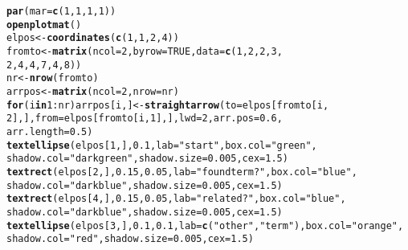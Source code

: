 \documentclass{article}\usepackage[]{graphicx}\usepackage[]{xcolor}
\makeatletter
\newcommand{\hlnum}[1]{\textcolor[rgb]{0.686,0.059,0.569}{#1}}%
\newcommand{\hlsng}[1]{\textcolor[rgb]{0.192,0.494,0.8}{#1}}%
\newcommand{\hlopt}[1]{\textcolor[rgb]{0,0,0}{#1}}%
\newcommand{\hldef}[1]{\textcolor[rgb]{0.345,0.345,0.345}{#1}}%
\newcommand{\hlkwa}[1]{\textcolor[rgb]{0.161,0.373,0.58}{\textbf{#1}}}%
\newcommand{\hlkwb}[1]{\textcolor[rgb]{0.69,0.353,0.396}{#1}}%
\newcommand{\hlkwc}[1]{\textcolor[rgb]{0.333,0.667,0.333}{#1}}%
\newcommand{\hlkwd}[1]{\textcolor[rgb]{0.737,0.353,0.396}{\textbf{#1}}}%
\newenvironment{kframe}{%
 \def\at@end@of@kframe{}%
 \ifinner\ifhmode%
  \def\at@end@of@kframe{\end{minipage}}%
  \begin{minipage}{\columnwidth}%
 \fi\fi%
 \def\FrameCommand##1{\hskip\@totalleftmargin \hskip-\fboxsep
 \colorbox{shadecolor}{##1}\hskip-\fboxsep
     \hskip-\linewidth \hskip-\@totalleftmargin \hskip\columnwidth}%
 \MakeFramed {\advance\hsize-\width
   \@totalleftmargin\z@ \linewidth\hsize
   \@setminipage}}%
 {\par\unskip\endMakeFramed%
 \at@end@of@kframe}
\newenvironment{knitrout}{}{} %
\makeatother
\begin{document}
\begin{knitrout}
\begin{kframe}
\begin{alltt}
\hlkwd{par}\hldef{(}\hlkwc{mar} \hldef{=} \hlkwd{c}\hldef{(}\hlnum{1}\hldef{,} \hlnum{1}\hldef{,} \hlnum{1}\hldef{,} \hlnum{1}\hldef{))}
\hlkwd{openplotmat}\hldef{()}
\hldef{elpos} \hlkwb{<-} \hlkwd{coordinates}\hldef{(}\hlkwd{c}\hldef{(}\hlnum{1}\hldef{,} \hlnum{1}\hldef{,} \hlnum{2}\hldef{,} \hlnum{4}\hldef{))}
\hldef{fromto} \hlkwb{<-} \hlkwd{matrix}\hldef{(}\hlkwc{ncol} \hldef{=} \hlnum{2}\hldef{,} \hlkwc{byrow} \hldef{=} \hlnum{TRUE}\hldef{,} \hlkwc{data} \hldef{=} \hlkwd{c}\hldef{(}\hlnum{1}\hldef{,} \hlnum{2}\hldef{,} \hlnum{2}\hldef{,} \hlnum{3}\hldef{,}
    \hlnum{2}\hldef{,} \hlnum{4}\hldef{,} \hlnum{4}\hldef{,} \hlnum{7}\hldef{,} \hlnum{4}\hldef{,} \hlnum{8}\hldef{))}
\hldef{nr} \hlkwb{<-} \hlkwd{nrow}\hldef{(fromto)}
\hldef{arrpos} \hlkwb{<-} \hlkwd{matrix}\hldef{(}\hlkwc{ncol} \hldef{=} \hlnum{2}\hldef{,} \hlkwc{nrow} \hldef{= nr)}
\hlkwa{for} \hldef{(i} \hlkwa{in} \hlnum{1}\hlopt{:}\hldef{nr) arrpos[i, ]} \hlkwb{<-} \hlkwd{straightarrow}\hldef{(}\hlkwc{to} \hldef{= elpos[fromto[i,}
    \hlnum{2}\hldef{], ],} \hlkwc{from} \hldef{= elpos[fromto[i,} \hlnum{1}\hldef{], ],} \hlkwc{lwd} \hldef{=} \hlnum{2}\hldef{,} \hlkwc{arr.pos} \hldef{=} \hlnum{0.6}\hldef{,}
    \hlkwc{arr.length} \hldef{=} \hlnum{0.5}\hldef{)}
\hlkwd{textellipse}\hldef{(elpos[}\hlnum{1}\hldef{, ],} \hlnum{0.1}\hldef{,} \hlkwc{lab} \hldef{=} \hlsng{"start"}\hldef{,} \hlkwc{box.col} \hldef{=} \hlsng{"green"}\hldef{,}
    \hlkwc{shadow.col} \hldef{=} \hlsng{"darkgreen"}\hldef{,} \hlkwc{shadow.size} \hldef{=} \hlnum{0.005}\hldef{,} \hlkwc{cex} \hldef{=} \hlnum{1.5}\hldef{)}
\hlkwd{textrect}\hldef{(elpos[}\hlnum{2}\hldef{, ],} \hlnum{0.15}\hldef{,} \hlnum{0.05}\hldef{,} \hlkwc{lab} \hldef{=} \hlsng{"found term?"}\hldef{,} \hlkwc{box.col} \hldef{=} \hlsng{"blue"}\hldef{,}
    \hlkwc{shadow.col} \hldef{=} \hlsng{"darkblue"}\hldef{,} \hlkwc{shadow.size} \hldef{=} \hlnum{0.005}\hldef{,} \hlkwc{cex} \hldef{=} \hlnum{1.5}\hldef{)}
\hlkwd{textrect}\hldef{(elpos[}\hlnum{4}\hldef{, ],} \hlnum{0.15}\hldef{,} \hlnum{0.05}\hldef{,} \hlkwc{lab} \hldef{=} \hlsng{"related?"}\hldef{,} \hlkwc{box.col} \hldef{=} \hlsng{"blue"}\hldef{,}
    \hlkwc{shadow.col} \hldef{=} \hlsng{"darkblue"}\hldef{,} \hlkwc{shadow.size} \hldef{=} \hlnum{0.005}\hldef{,} \hlkwc{cex} \hldef{=} \hlnum{1.5}\hldef{)}
\hlkwd{textellipse}\hldef{(elpos[}\hlnum{3}\hldef{, ],} \hlnum{0.1}\hldef{,} \hlnum{0.1}\hldef{,} \hlkwc{lab} \hldef{=} \hlkwd{c}\hldef{(}\hlsng{"other"}\hldef{,} \hlsng{"term"}\hldef{),} \hlkwc{box.col} \hldef{=} \hlsng{"orange"}\hldef{,}
    \hlkwc{shadow.col} \hldef{=} \hlsng{"red"}\hldef{,} \hlkwc{shadow.size} \hldef{=} \hlnum{0.005}\hldef{,} \hlkwc{cex} \hldef{=} \hlnum{1.5}\hldef{)}

\end{alltt}
\end{kframe}
\end{knitrout}
\end{document}

